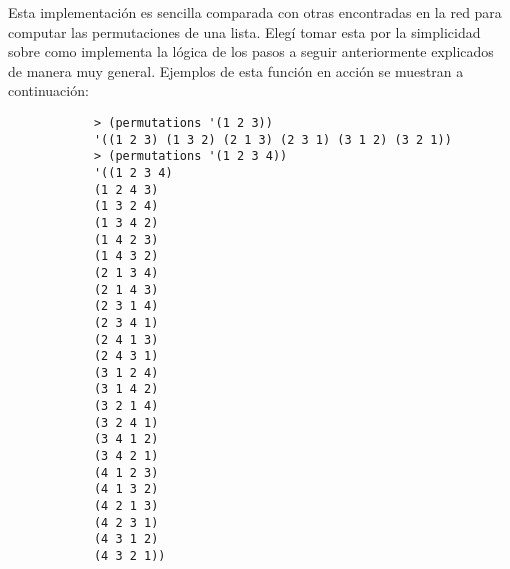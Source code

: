 \begin{enumerate}
\begin{solution}
        Esta implementación es sencilla comparada con otras encontradas en la red para computar las permutaciones de una lista. Elegí tomar esta por la simplicidad sobre como implementa la lógica de los pasos a seguir anteriormente explicados de manera muy general. Ejemplos de esta función en acción se muestran a continuación:
        \begin{verbatim}
            > (permutations '(1 2 3))
            '((1 2 3) (1 3 2) (2 1 3) (2 3 1) (3 1 2) (3 2 1))
            > (permutations '(1 2 3 4))
            '((1 2 3 4)
            (1 2 4 3)
            (1 3 2 4)
            (1 3 4 2)
            (1 4 2 3)
            (1 4 3 2)
            (2 1 3 4)
            (2 1 4 3)
            (2 3 1 4)
            (2 3 4 1)
            (2 4 1 3)
            (2 4 3 1)
            (3 1 2 4)
            (3 1 4 2)
            (3 2 1 4)
            (3 2 4 1)
            (3 4 1 2)
            (3 4 2 1)
            (4 1 2 3)
            (4 1 3 2)
            (4 2 1 3)
            (4 2 3 1)
            (4 3 1 2)
            (4 3 2 1))
        \end{verbatim}


\end{solution}
\end{enumerate}
